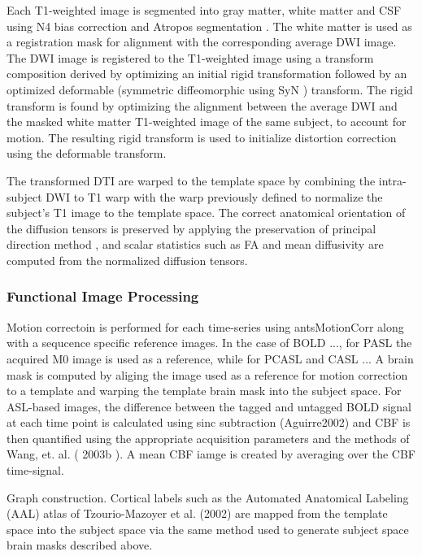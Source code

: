 Each T1-weighted image is segmented into gray matter, white matter and CSF using N4 bias correction \cite{tustison2010} and Atropos segmentation \cite{Avants2011a}. The white matter is used as a registration mask for alignment with the corresponding average DWI image. The DWI image is registered to the T1-weighted image using a transform composition derived by optimizing an initial rigid transformation followed by an optimized deformable (symmetric diffeomorphic using SyN \cite{Avants2011}) transform. The rigid transform is found by optimizing the alignment between the average DWI and the masked white matter T1-weighted image of the same subject, to account for motion. The resulting rigid transform is used to initialize distortion correction using the deformable transform.

The transformed DTI are warped to the template space by combining the intra-subject DWI to T1 warp with the warp previously defined to normalize the subject's T1 image to the template space. The correct anatomical orientation of the diffusion tensors is preserved by applying the preservation of principal direction method \cite{Alexander2001}, and scalar statistics such as FA and mean diffusivity are computed from the normalized diffusion tensors.


\subsubsection{Functional Image Processing}

Motion correctoin is performed for each time-series using
antsMotionCorr along with a sequcence specific reference images. In
the case of BOLD ..., for PASL the acquired M0 image is used as a
reference, while for PCASL and CASL ... A brain mask is computed by
aliging the image used as a reference for motion correction to a
template and warping the template brain mask into the subject
space. For ASL-based images, the difference between the tagged and
untagged BOLD signal at each time point is calculated using sinc subtraction (Aguirre2002) and CBF is
then quantified using the appropriate acquisition parameters and the
methods of Wang, et. al. ( 2003b ). A mean CBF iamge is created by
averaging over the CBF time-signal. 

Graph construction. Cortical labels such as the Automated Anatomical
Labeling (AAL) atlas of Tzourio-Mazoyer et al. (2002) are mapped from
the template space into the subject space via the same method used to
generate subject space brain masks described above. 

